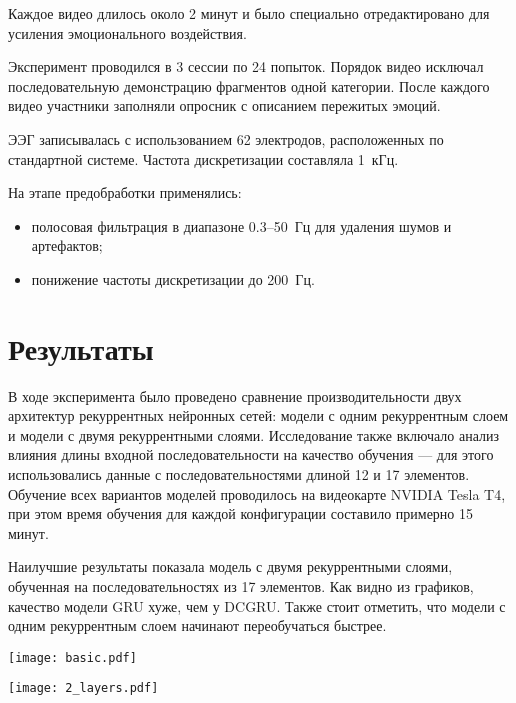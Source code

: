 \documentclass[12pt, twoside]{article}
\begin{document}
Каждое видео длилось около 2 минут и было специально отредактировано для усиления эмоционального воздействия.

Эксперимент проводился в 3 сессии по 24 попыток. Порядок видео исключал последовательную демонстрацию фрагментов одной категории. После каждого видео участники заполняли опросник с описанием пережитых эмоций.

ЭЭГ записывалась с использованием 62 электродов, расположенных по стандартной системе. Частота дискретизации составляла 1~кГц.

На этапе предобработки применялись:
\begin{itemize}
    \item полосовая фильтрация в диапазоне 0.3--50~Гц для удаления шумов и артефактов;
    \item понижение частоты дискретизации до 200~Гц.
\end{itemize}

\section{Результаты}

В ходе эксперимента было проведено сравнение производительности двух архитектур рекуррентных нейронных сетей: модели с одним рекуррентным слоем и модели с двумя рекуррентными слоями. Исследование также включало анализ влияния длины входной последовательности на качество обучения — для этого использовались данные с последовательностями длиной 12 и 17 элементов. Обучение всех вариантов моделей проводилось на видеокарте NVIDIA Tesla T4, при этом время обучения для каждой конфигурации составило примерно 15 минут.

Наилучшие результаты показала модель с двумя рекуррентными слоями, обученная на последовательностях из 17 элементов. Как видно из графиков, качество модели GRU хуже, чем у DCGRU.
Также стоит отметить, что модели с одним рекуррентным слоем начинают переобучаться быстрее.
\begin{center}
\texttt{[image: basic.pdf]}
\end{center}

\begin{center}
\texttt{[image: 2\_layers.pdf]}
\end{center}
\end{document}
